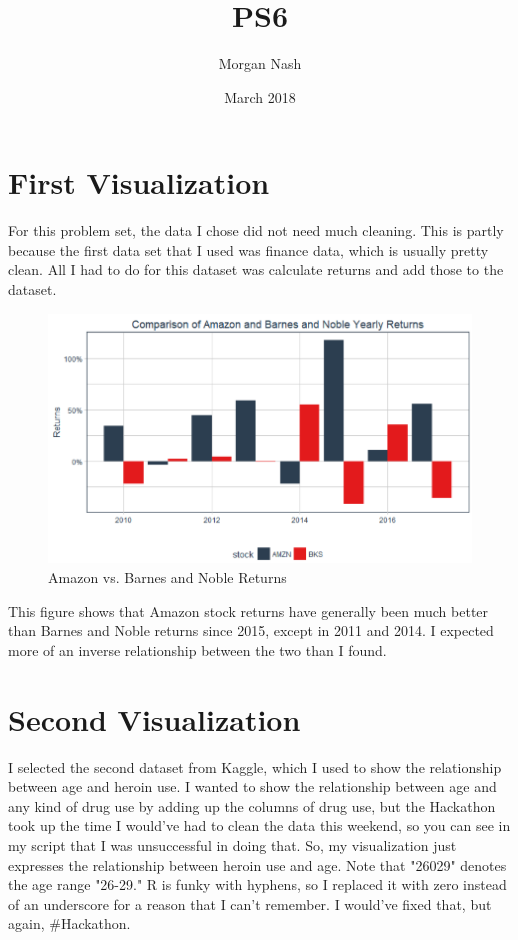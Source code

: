 \documentclass{article}
\title{PS6}
\author{Morgan Nash}
\date{March 2018}
\begin{document}
\maketitle

\section{First Visualization}
For this problem set, the data I chose did not need much cleaning. This is partly because the first data set that I used was finance data, which is usually pretty clean. All I had to do for this dataset was calculate returns and add those to the dataset. 

\begin{figure}[h!]
\centering
\includegraphics[scale=0.75]{PS6a_Nash}
\caption{Amazon vs. Barnes and Noble Returns}
\label{fig:PS6a_Nash}
\end{figure}

This figure shows that Amazon stock returns have generally been much better than Barnes and Noble returns since 2015, except in 2011 and 2014. I expected more of an inverse relationship between the two than I found.


\section{Second Visualization}

I selected the second dataset from Kaggle, which I used to show the relationship between age and heroin use. I wanted to show the relationship between age and any kind of drug use by adding up the columns of drug use, but the Hackathon took up the time I would've had to clean the data this weekend, so you can see in my script that I was unsuccessful in doing that. So, my visualization just expresses the relationship between heroin use and age. Note that "26029" denotes the age range "26-29." R is funky with hyphens, so I replaced it with zero instead of an underscore for a reason that I can't remember. I would've fixed that, but again, #Hackathon.
\end{document}
